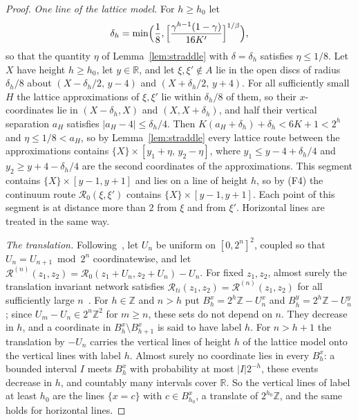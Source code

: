 \documentclass[11pt]{amsart}
\theoremstyle{remark}
\newcommand{\R}{\mathbb{R}}
\newcommand{\Z}{\mathbb{Z}}
\begin{document}
\begin{proof}
\emph{One line of the lattice model.} For $h\ge h_0$ let
\[
\delta_h=\min\Bigl(\frac18,\Bigl[\frac{\gamma^{h-1}(1-\gamma)}{16K'}\Bigr]^{1/\beta}\Bigr),
\]
so that the quantity $\eta$ of Lemma~\ref{lem:straddle} with $\delta=\delta_h$ satisfies $\eta\le1/8$. Let $X$ have
height $h\ge h_0$, let $y\in\R$, and let $\xi,\xi'\notin A$ lie in the open discs of radius $\delta_h/8$ about
$(X-\delta_h/2,\,y-4)$ and $(X+\delta_h/2,\,y+4)$. For all sufficiently small $H$ the lattice approximations of
$\xi,\xi'$ lie within $\delta_h/8$ of them, so their $x$-coordinates lie in $(X-\delta_h,X)$ and $(X,X+\delta_h)$, and
half their vertical separation $a_H$ satisfies $|a_H-4|\le\delta_h/4$. Then
$K(a_H+\delta_h)+\delta_h<6K+1<2^h$ and $\eta\le1/8<a_H$, so by Lemma~\ref{lem:straddle} every lattice route between
the approximations contains $\{X\}\times[y_{1}+\eta,\,y_{2}-\eta]$, where $y_1\le y-4+\delta_h/4$ and
$y_2\ge y+4-\delta_h/4$ are the second coordinates of the approximations. This segment contains
$\{X\}\times[y-1,y+1]$ and lies on a line of height $h$, so by (F4) the continuum route $\mathcal R_0(\xi,\xi')$
contains $\{X\}\times[y-1,y+1]$. Each point of this segment is at distance more than $2$ from $\xi$ and from $\xi'$.
Horizontal lines are treated in the same way.

\emph{The translation.} Following~\cite[Section~3.7]{A14}, let $U_n$ be uniform on $[0,2^n]^2$, coupled so that
$U_n=U_{n+1}\bmod 2^n$ coordinatewise, and let
$\mathcal R^{(n)}(z_1,z_2)=\mathcal R_0(z_1+U_n,z_2+U_n)-U_n$. For fixed $z_1,z_2$, almost surely the translation
invariant network satisfies $\mathcal R_{ti}(z_1,z_2)=\mathcal R^{(n)}(z_1,z_2)$ for all sufficiently large
$n$~\cite[(3.3), (3.4)]{A14}. For $h\in\Z$ and $n>h$ put $B^x_h=2^h\Z-U^x_n$ and $B^y_h=2^h\Z-U^y_n$; since
$U_m-U_n\in2^n\Z^2$ for $m\ge n$, these sets do not depend on $n$. They decrease in $h$, and a coordinate in
$B^x_h\setminus B^x_{h+1}$ is said to have label $h$. For $n>h+1$ the translation by $-U_n$ carries the vertical lines
of height $h$ of the lattice model onto the vertical lines with label $h$. Almost surely no coordinate lies in every
$B^x_h$: a bounded interval $I$ meets $B^x_h$ with probability at most $|I|2^{-h}$, these events decrease in $h$, and
countably many intervals cover $\R$. So the vertical lines of label at least $h_0$ are the lines $\{x=c\}$ with
$c\in B^x_{h_0}$, a translate of $2^{h_0}\Z$, and the same holds for horizontal lines.


\end{proof}
\end{document}
